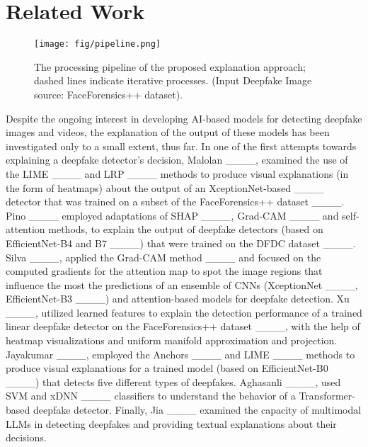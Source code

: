 \section{Related Work}
\begin{figure*}[t]
\centering
\texttt{[image: fig/pipeline.png]}
\caption{The processing pipeline of the proposed explanation approach; dashed lines indicate iterative processes. (Input Deepfake Image source: FaceForensics++ dataset).}
\label{fig:pipeline}
\end{figure*}

Despite the ongoing interest in developing AI-based models for detecting deepfake images and videos, the explanation of the output of these models has been investigated only to a small extent, thus far. In one of the first attempts towards explaining a deepfake detector's decision, Malolan \etal ____, examined the use of the LIME ____ and LRP ____ methods to produce visual explanations (in the form of heatmaps) about the output of an XceptionNet-based ____ detector that was trained on a subset of the FaceForensics++ dataset ____. Pino \etal ____ employed adaptations of SHAP ____, Grad-CAM ____ and self-attention methods, to explain the output of deepfake detectors (based on EfficientNet-B4 and B7 ____) that were trained on the DFDC dataset ____. Silva \etal ____, applied the Grad-CAM method ____ and focused on the computed gradients for the attention map to spot the image regions that influence the most the predictions of an ensemble of CNNs (XceptionNet ____, EfficientNet-B3 ____) and attention-based models for deepfake detection. Xu \etal ____, utilized learned features to explain the detection performance of a trained linear deepfake detector on the FaceForensics++ dataset ____, with the help of heatmap visualizations and uniform manifold approximation and projection. Jayakumar \etal ____, employed the Anchors ____ and LIME ____ methods to produce visual explanations for a trained model (based on EfficientNet-B0 ____) that detects five different types of deepfakes. Aghasanli \etal ____, used SVM and xDNN ____ classifiers to understand the behavior of a Transformer-based deepfake detector. Finally, Jia \etal ____ examined the capacity of multimodal LLMs in detecting deepfakes and providing textual explanations about their decisions.


